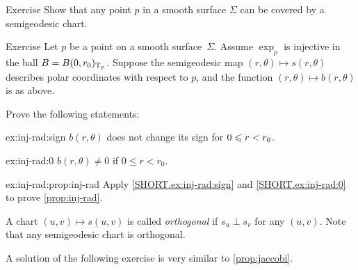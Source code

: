 \begin{thm}{Exercise}\label{ex:semigeodesc-chart}
Show that any point $p$ in a smooth surface $\Sigma$ can be covered by a semigeodesic chart.
\end{thm}

\begin{thm}{Exercise}\label{ex:inj-rad}
Let $p$ be a point on a smooth surface~$\Sigma$.
Assume $\exp_p$ is injective in the ball $B=B(0,r_0)_{\mathrm{T}_p}$.
Suppose the semigeodesic map $(r,\theta)\mapsto s(r,\theta)$ describes polar coordinates with respect to $p$, and the function $(r,\theta)\mapsto b(r,\theta)$ is as above.

Prove the following statements:

\begin{subthm}{ex:inj-rad:sign}
$b(r,\theta)$ does not change its sign for $0\z\le r\z<r_0$.
\end{subthm}

\begin{subthm}{ex:inj-rad:0}
$b(r,\theta)\ne0$ if $0\le r<r_0$.
\end{subthm}

\begin{subthm}{ex:inj-rad:prop:inj-rad}
Apply \ref{SHORT.ex:inj-rad:sign} and \ref{SHORT.ex:inj-rad:0} to prove \ref{prop:inj-rad}.
\end{subthm}
 
\end{thm}



A chart $(u,v)\mapsto s(u,v)$ is called \emph{orthogonal} if $s_u\perp s_v$ for any $(u,v)$.
Note that any semigeodesic chart is orthogonal.

A solution of the following exercise is very similar to \ref{prop:jaccobi}.

